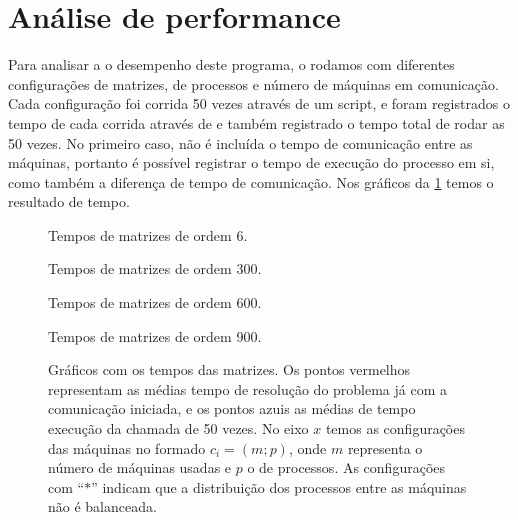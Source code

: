 \section{Análise de performance}

Para analisar a o desempenho deste programa, o rodamos com diferentes configurações de matrizes,
de processos e número de máquinas em comunicação. Cada configuração foi corrida 50 vezes
através de um script, e foram registrados o tempo de cada corrida através de
  e também registrado o tempo total de rodar as 50 vezes.%
No primeiro caso, não é incluída o tempo de comunicação entre as máquinas, portanto
é possível registrar o tempo de execução do processo em si, como também a diferença
de tempo de comunicação. Nos gráficos da \cref{fig:timing-graphs} temos o resultado de tempo.

\begin{figure}[htp]
  \centering
	\begin{minipage}{.49\linewidth}
    \begin{SubFloat}{Tempos de matrizes de ordem 6.\label{fig:timings6}}
			
		\end{SubFloat}
	\end{minipage}
	\begin{minipage}{.49\linewidth}
    \begin{SubFloat}{Tempos de matrizes de ordem 300.\label{fig:timings300}}
			
		\end{SubFloat}
	\end{minipage}

	\begin{minipage}{.7\linewidth}
    \begin{SubFloat}{Tempos de matrizes de ordem 600.\label{fig:timings600}}
			
		\end{SubFloat}
	\end{minipage}

	\begin{minipage}{.7\linewidth}
    \begin{SubFloat}{Tempos de matrizes de ordem 900.\label{fig:timings900}}
			
		\end{SubFloat}
	\end{minipage}
  \caption{\small
    Gráficos com os tempos das matrizes. Os pontos vermelhos representam as médias tempo de resolução 
    do problema já com a comunicação iniciada, e os pontos azuis as médias de tempo execução da chamada
    de  50 vezes. No eixo \(x\) temos as configurações das máquinas no formado \(c_i=(m;p)\),
    onde \(m\) representa o número de máquinas usadas e \(p\) o de processos. As configurações
    com \enquote{\(*\)} indicam que a distribuição dos processos entre as máquinas não é balanceada.
  }\label{fig:timing-graphs}
\end{figure}

